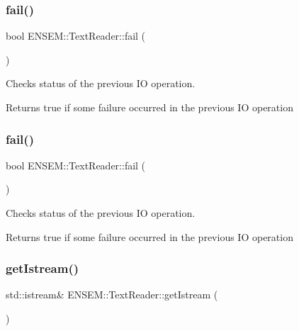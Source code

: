 \mbox{\label{classENSEM_1_1TextReader_ae21c25d2a62a1b242b09d745a314af69}} 
\subsubsection{\texorpdfstring{fail()}{fail()}\hspace{0.1cm}{\footnotesize\ttfamily [1/2]}}
{\footnotesize\ttfamily bool E\+N\+S\+E\+M\+::\+Text\+Reader\+::fail (\begin{DoxyParamCaption}{ }\end{DoxyParamCaption})}



Checks status of the previous IO operation. 

\begin{DoxyReturn}{Returns}
true if some failure occurred in the previous IO operation 
\end{DoxyReturn}
\mbox{\label{classENSEM_1_1TextReader_ae21c25d2a62a1b242b09d745a314af69}} 
\subsubsection{\texorpdfstring{fail()}{fail()}\hspace{0.1cm}{\footnotesize\ttfamily [2/2]}}
{\footnotesize\ttfamily bool E\+N\+S\+E\+M\+::\+Text\+Reader\+::fail (\begin{DoxyParamCaption}{ }\end{DoxyParamCaption})}



Checks status of the previous IO operation. 

\begin{DoxyReturn}{Returns}
true if some failure occurred in the previous IO operation 
\end{DoxyReturn}
\mbox{\label{classENSEM_1_1TextReader_a855b7272df1bd50c18f730f3ac882428}} 
\subsubsection{\texorpdfstring{getIstream()}{getIstream()}\hspace{0.1cm}{\footnotesize\ttfamily [1/2]}}
{\footnotesize\ttfamily std\+::istream\& E\+N\+S\+E\+M\+::\+Text\+Reader\+::get\+Istream (\begin{DoxyParamCaption}{ }\end{DoxyParamCaption})\hspace{0.3cm}{\ttfamily [inline]}}




